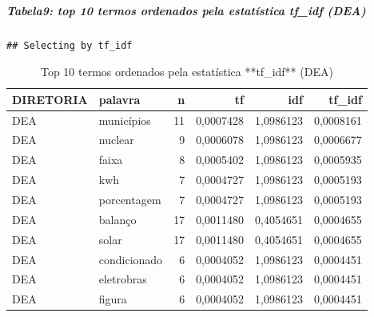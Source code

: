 \documentclass[]{article}
\newenvironment{Shaded}{\begin{snugshade}}{\end{snugshade}}
\newcommand{\KeywordTok}[1]{\textcolor[rgb]{0.13,0.29,0.53}{\textbf{#1}}}
\newcommand{\DataTypeTok}[1]{\textcolor[rgb]{0.13,0.29,0.53}{#1}}
\newcommand{\DecValTok}[1]{\textcolor[rgb]{0.00,0.00,0.81}{#1}}
\newcommand{\StringTok}[1]{\textcolor[rgb]{0.31,0.60,0.02}{#1}}
\newcommand{\OperatorTok}[1]{\textcolor[rgb]{0.81,0.36,0.00}{\textbf{#1}}}
\newcommand{\NormalTok}[1]{#1}
\let\oldsubparagraph\subparagraph
\renewcommand{\subparagraph}[1]{\oldsubparagraph{#1}\mbox{}}
\begin{document}
\subparagraph{\texorpdfstring{Tabela9: top 10 termos ordenados pela
estatística \textbf{tf\_idf}
(DEA)}{Tabela9: top 10 termos ordenados pela estatística tf\_idf (DEA)}}\label{tabela9-top-10-termos-ordenados-pela-estatistica-tf_idf-dea}

\begin{Shaded}
\end{Shaded}

\begin{verbatim}
## Selecting by tf_idf
\end{verbatim}

\begin{table}[!h]

\caption{\label{tab:unnamed-chunk-35}Top 10 termos ordenados pela estatística **tf_idf** (DEA)}
\centering
\begin{tabular}{llrrrr}
\toprule
DIRETORIA & palavra & n & tf & idf & tf\_idf\\
\midrule
\rowcolor{gray!6}  DEA & municípios & 11 & 0,0007428 & 1,0986123 & 0,0008161\\
DEA & nuclear & 9 & 0,0006078 & 1,0986123 & 0,0006677\\
\rowcolor{gray!6}  DEA & faixa & 8 & 0,0005402 & 1,0986123 & 0,0005935\\
DEA & kwh & 7 & 0,0004727 & 1,0986123 & 0,0005193\\
\rowcolor{gray!6}  DEA & porcentagem & 7 & 0,0004727 & 1,0986123 & 0,0005193\\
\addlinespace
DEA & balanço & 17 & 0,0011480 & 0,4054651 & 0,0004655\\
\rowcolor{gray!6}  DEA & solar & 17 & 0,0011480 & 0,4054651 & 0,0004655\\
DEA & condicionado & 6 & 0,0004052 & 1,0986123 & 0,0004451\\
\rowcolor{gray!6}  DEA & eletrobras & 6 & 0,0004052 & 1,0986123 & 0,0004451\\
DEA & figura & 6 & 0,0004052 & 1,0986123 & 0,0004451\\
\bottomrule
\end{tabular}
\end{table}
\end{document}
